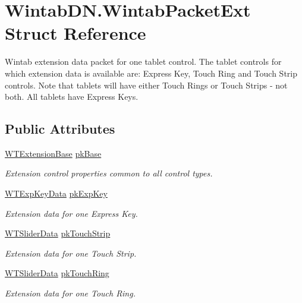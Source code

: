 \hypertarget{struct_wintab_d_n_1_1_wintab_packet_ext}{}\section{Wintab\+D\+N.\+Wintab\+Packet\+Ext Struct Reference}
\label{struct_wintab_d_n_1_1_wintab_packet_ext}


Wintab extension data packet for one tablet control. The tablet controls for which extension data is available are\+: Express Key, Touch Ring and Touch Strip controls. Note that tablets will have either Touch Rings or Touch Strips -\/ not both. All tablets have Express Keys.  


\subsection*{Public Attributes}
\begin{DoxyCompactItemize}
\item 
\mbox{\hyperlink{struct_wintab_d_n_1_1_w_t_extension_base}{W\+T\+Extension\+Base}} \mbox{\hyperlink{struct_wintab_d_n_1_1_wintab_packet_ext_af836dcde9fde108fc13c835eeef56468}{pk\+Base}}
\begin{DoxyCompactList}\small\item\em Extension control properties common to all control types. \end{DoxyCompactList}\item 
\mbox{\hyperlink{struct_wintab_d_n_1_1_w_t_exp_key_data}{W\+T\+Exp\+Key\+Data}} \mbox{\hyperlink{struct_wintab_d_n_1_1_wintab_packet_ext_ab6450d462add690f1d84f0d4d0e71967}{pk\+Exp\+Key}}
\begin{DoxyCompactList}\small\item\em Extension data for one Express Key. \end{DoxyCompactList}\item 
\mbox{\hyperlink{struct_wintab_d_n_1_1_w_t_slider_data}{W\+T\+Slider\+Data}} \mbox{\hyperlink{struct_wintab_d_n_1_1_wintab_packet_ext_a563f04600ae40cbcef2a146dd88020b6}{pk\+Touch\+Strip}}
\begin{DoxyCompactList}\small\item\em Extension data for one Touch Strip. \end{DoxyCompactList}\item 
\mbox{\hyperlink{struct_wintab_d_n_1_1_w_t_slider_data}{W\+T\+Slider\+Data}} \mbox{\hyperlink{struct_wintab_d_n_1_1_wintab_packet_ext_aef671e3cbf8f82fc4a2d83db6ae33bb2}{pk\+Touch\+Ring}}
\begin{DoxyCompactList}\small\item\em Extension data for one Touch Ring. \end{DoxyCompactList}\end{DoxyCompactItemize}


